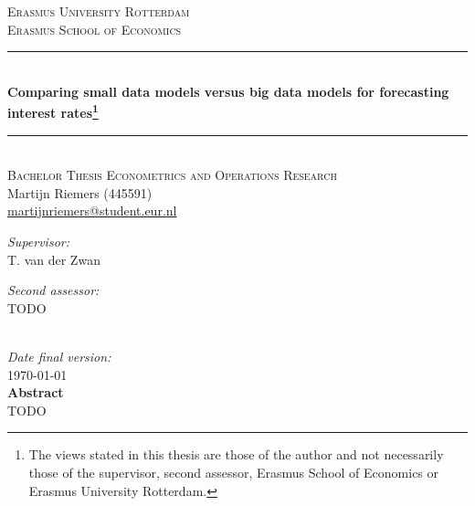 \begin{titlepage}	
	\begin{center}
		\textsc{\Large{Erasmus University Rotterdam}} \\[.7cm]
		\textsc{Erasmus School of Economics} \\[0.5cm]
		
		\rule{\linewidth}{0.5mm} \\[0.4cm]
		\huge{\bfseries{Comparing small data models versus big data models for forecasting interest rates\footnote{The views stated in this thesis are those of the author and not necessarily those of the supervisor, second assessor, Erasmus School of Economics or Erasmus University Rotterdam.}}} \\
		\rule{\linewidth}{0.5mm} \\[.5cm]
		
		\textsc{\large{Bachelor Thesis Econometrics and Operations Research}} \\[.5cm]
		
		\large{Martijn Riemers (445591)} \\
		\large{\href{mailto:martijnriemers@student.eur.nl}{martijnriemers@student.eur.nl}} \\[.75cm]	
		
		\begin{minipage}[t]{0.4\textwidth}
		\center
		\large{\emph{Supervisor:}}\\
		\large{T. van der Zwan}
		\end{minipage}
		\begin{minipage}[t]{0.4\textwidth}
		\center
		\large{\emph{Second assessor:}} \\
		\large{TODO}
		\end{minipage}\\[.75cm]
		
		\large{\emph{Date final version:}} \\
		\large{\today} \\[3cm]
		
		\textbf{Abstract} \\
		TODO
	\end{center}
\end{titlepage}